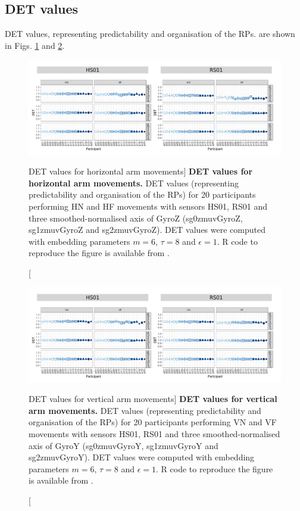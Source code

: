 \newpage
\subsection{DET values}
DET values, representing predictability and organisation of the RPs.
are shown in Figs. \ref{fig:det_aH} and \ref{fig:det_aV}.


\begin{figure}
\centering
\includegraphics[width=1.0\textwidth]{det_aH}
    \caption
	[DET values for horizontal arm movements]{
	{\bf DET values for horizontal arm movements.}	
    	DET values (representing predictability and organisation of the RPs)
	for 20 participants performing HN and HF movements
	with sensors HS01, RS01 and three smoothed-normalised axis 
	of GyroZ (sg0zmuvGyroZ, sg1zmuvGyroZ and sg2zmuvGyroZ).
	DET values were computed with 
	embedding parameters $m=6$, $\tau=8$ and $\epsilon=1$.
	R code to reproduce the figure is available from \cite{hwum2018}.
        }
    \label{fig:det_aH}
\end{figure}
\begin{figure}
\centering
\includegraphics[width=1.0\textwidth]{det_aV}
    \caption
	[DET values for vertical arm movements]{
	{\bf DET values for vertical arm movements.}	
    	DET values (representing predictability and organisation of the RPs) 
	for 20 participants performing VN and VF movements
	with sensors HS01, RS01 and three smoothed-normalised axis 
	of GyroY (sg0zmuvGyroY, sg1zmuvGyroY and sg2zmuvGyroY).
	DET values were computed with 
	embedding parameters $m=6$, $\tau=8$ and $\epsilon=1$.
	R code to reproduce the figure is available from \cite{hwum2018}.
        }
    \label{fig:det_aV}
\end{figure}




